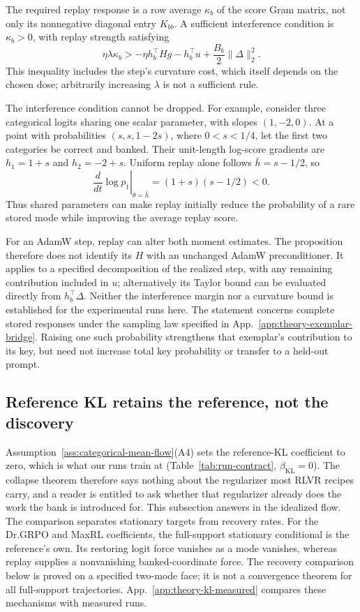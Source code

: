 \documentclass{article}
\newcommand{\1}{\mathbf 1}
\theoremstyle{remark}
\theoremstyle{definition}
\theoremstyle{plain}
\begin{document}
The required replay response is a row average $\kappa_b$ of the score Gram
matrix, not only its nonnegative diagonal entry $K_{bb}$. A sufficient
interference condition is $\kappa_b>0$, with replay strength satisfying
\[
 \eta\lambda\kappa_b>
   -\eta h_b^\top Hg-h_b^\top u
       +\frac{B_b}{2}\|\Delta\|_2^2.
\]
This inequality includes the step's curvature cost, which itself depends on
the chosen dose; arbitrarily increasing $\lambda$ is not a sufficient rule.

The interference condition cannot be dropped. For example, consider three
categorical logits sharing one scalar parameter, with slopes $(1,-2,0)$.
At a point with probabilities $(s,s,1-2s)$, where $0<s<1/4$, let the first
two categories be correct and banked. Their unit-length log-score gradients
are $h_1=1+s$ and $h_2=-2+s$. Uniform replay alone follows
$\bar h=s-1/2$, so
\[
 \left.\frac{d}{dt}\log p_1\right|_{\dot\theta=\bar h}
   =(1+s)(s-1/2)<0.
\]
Thus shared parameters can make replay initially reduce the probability of
a rare stored mode while improving the average replay score.

For an AdamW step, replay can alter both moment estimates. The proposition
therefore does not identify its $H$ with an unchanged AdamW preconditioner.
It applies to a specified decomposition of the realized step, with any
remaining contribution included in $u$; alternatively its Taylor bound can
be evaluated directly from $h_b^\top\Delta$. Neither the interference margin
nor a curvature bound is established for the experimental runs here.
The statement concerns complete stored responses under the sampling law
specified in App.~\ref{app:theory-exemplar-bridge}. Raising one such
probability strengthens that exemplar's contribution to its key, but need
not increase total key probability or transfer to a held-out prompt.


\subsection{Reference KL retains the reference, not the discovery}
\label{app:theory-kl}

Assumption~\ref{ass:categorical-mean-flow}(A4) sets the reference-KL
coefficient to zero, which is what our runs train at
(Table~\ref{tab:run-contract}, $\beta_{\mathrm{KL}}=0$). The collapse theorem
therefore says nothing about the regularizer most RLVR recipes carry, and a
reader is entitled to ask whether that regularizer already does the work the
bank is introduced for. This subsection answers in the idealized flow. The
comparison separates stationary targets from recovery rates. For the
Dr.GRPO and MaxRL coefficients, the full-support stationary conditional is
the reference's own. Its restoring logit force vanishes as a mode vanishes,
whereas replay supplies a nonvanishing banked-coordinate force.
The recovery comparison below is proved on a specified two-mode face; it is
not a convergence theorem for all full-support trajectories.
App.~\ref{app:theory-kl-measured} compares these mechanisms with measured runs.
\end{document}
